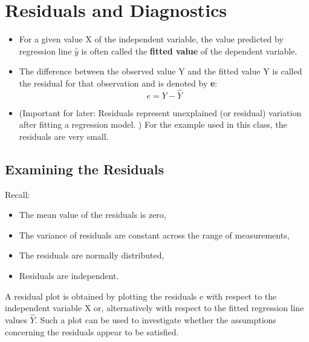 \documentclass{article}
\begin{document}
	\tableofcontents







\section{Residuals and Diagnostics}
\begin{itemize}
\item For a given value X of the independent variable, the value predicted by regression line $\hat{y}$ is often called the \textbf{fitted
	value} of the dependent variable. 
\item The difference between the observed value Y and the fitted value Y
is called the residual for that observation and is denoted by \textbf{e}:
\[e= Y-\hat{Y}\]

\item (Important for later: Residuals represent unexplained (or residual) variation after fitting a regression
model. )
For the example used in this class, the residuals are very small.
\end{itemize}


\subsection{Examining the Residuals}

Recall: 
\begin{itemize}
\item The mean value of the residuals is zero,
\item The variance of residuals are constant across the range of measurements,
\item The residuals are normally distributed,
\item Residuals are independent.
\end{itemize}
 
A residual plot is obtained by plotting the residuals e with respect to the independent variable X or,
alternatively with respect to the fitted regression line values $\hat{Y}$. Such a plot can be used to
investigate whether the assumptions concerning the residuals appear to be satisfied.
\end{document}
